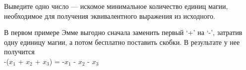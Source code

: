 \begin{problem}
\OutputFile

Выведите одно число — искомое минимальное количество единиц магии, необходимое для получения эквивалентного выражения из исходного.

\Examples

\begin{example}
%
%
\end{example}

\Explanation

В первом примере Эмме выгодно сначала заменить первый ‘+’ на ‘-’, затратив одну единицу магии, а потом бесплатно поставить скобки. В результате у нее получится\\

-($x_1$ + $x_2$ + $x_3$) = -$x_1$ - $x_2$ - $x_3$

\end{problem}
